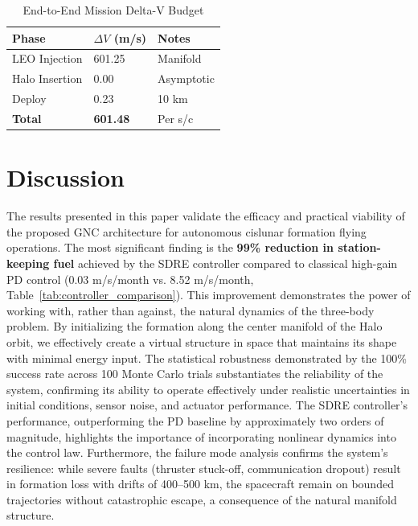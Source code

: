 \documentclass[10pt,letterpaper]{article}
\begin{document}
\begin{table}[htbp]
\caption{End-to-End Mission Delta-V Budget}
\label{tab:mission_budget}
\centering
\renewcommand{\arraystretch}{1.2}
\begin{tabularx}{\textwidth}{lYY}
\toprule
\textbf{Phase} & \textbf{$\Delta V$ (m/s)} & \textbf{Notes} \\
\midrule
LEO Injection & 601.25 & Manifold \\
Halo Insertion & 0.00 & Asymptotic \\
Deploy & 0.23 & 10 km \\
\midrule
\textbf{Total} & \textbf{601.48} & Per s/c \\
\bottomrule
\end{tabularx}
\end{table}



\section{Discussion}

The results presented in this paper validate the efficacy and practical viability of the proposed GNC architecture for autonomous cislunar formation flying operations. The most significant finding is the \textbf{99\% reduction in station-keeping fuel} achieved by the SDRE controller compared to classical high-gain PD control (0.03 m/s/month vs. 8.52 m/s/month, Table~\ref{tab:controller_comparison}). This improvement demonstrates the power of working with, rather than against, the natural dynamics of the three-body problem. By initializing the formation along the center manifold of the Halo orbit, we effectively create a virtual structure in space that maintains its shape with minimal energy input. The statistical robustness demonstrated by the 100\% success rate across 100 Monte Carlo trials substantiates the reliability of the system, confirming its ability to operate effectively under realistic uncertainties in initial conditions, sensor noise, and actuator performance. The SDRE controller's performance, outperforming the PD baseline by approximately two orders of magnitude, highlights the importance of incorporating nonlinear dynamics into the control law. Furthermore, the failure mode analysis confirms the system's resilience: while severe faults (thruster stuck-off, communication dropout) result in formation loss with drifts of 400--500 km, the spacecraft remain on bounded trajectories without catastrophic escape, a consequence of the natural manifold structure.
\end{document}
